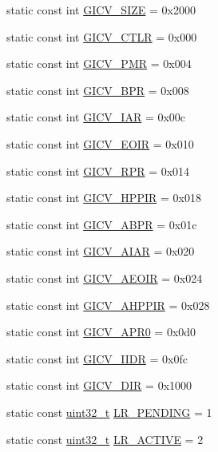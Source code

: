 \begin{DoxyCompactItemize}
\item 
static const int \hyperlink{classVGic_a327649260109afc17ff86a3a8371cb95}{GICV\_\-SIZE} = 0x2000
\item 
static const int \hyperlink{classVGic_ab4280dfa561ca960d58d341662849f7b}{GICV\_\-CTLR} = 0x000
\item 
static const int \hyperlink{classVGic_a25c57288ef4b1aad4afbc584a92b8391}{GICV\_\-PMR} = 0x004
\item 
static const int \hyperlink{classVGic_ab87c04cb10d6d7d4dc9bfdb41e67bd55}{GICV\_\-BPR} = 0x008
\item 
static const int \hyperlink{classVGic_a132fc471769307b51fb6ee13cd852835}{GICV\_\-IAR} = 0x00c
\item 
static const int \hyperlink{classVGic_ae75c9bc58bd94b6dfc83ecc0ea89e767}{GICV\_\-EOIR} = 0x010
\item 
static const int \hyperlink{classVGic_a1f4656693af03dc9ad24b55cf12eaaca}{GICV\_\-RPR} = 0x014
\item 
static const int \hyperlink{classVGic_adeb087954f3f7141cc49dd6236b4aa4c}{GICV\_\-HPPIR} = 0x018
\item 
static const int \hyperlink{classVGic_ac2262138aebc47d7e32b347f6cb580a6}{GICV\_\-ABPR} = 0x01c
\item 
static const int \hyperlink{classVGic_a471e427964bbc593aee5f4ce918b6ce2}{GICV\_\-AIAR} = 0x020
\item 
static const int \hyperlink{classVGic_a91ec09125f0759c2d32fa7bba32f3b03}{GICV\_\-AEOIR} = 0x024
\item 
static const int \hyperlink{classVGic_a95e1cf51d24aa765e82dd89f10321062}{GICV\_\-AHPPIR} = 0x028
\item 
static const int \hyperlink{classVGic_aa0efd17f14c57d720c184ee92b83ee05}{GICV\_\-APR0} = 0x0d0
\item 
static const int \hyperlink{classVGic_a40aac9b1ed27436f1ef04ff0f4b03f66}{GICV\_\-IIDR} = 0x0fc
\item 
static const int \hyperlink{classVGic_a806d487cfebc43c0536726f39a340463}{GICV\_\-DIR} = 0x1000
\item 
static const \hyperlink{Type_8hh_a435d1572bf3f880d55459d9805097f62}{uint32\_\-t} \hyperlink{classVGic_a0494deefa99c7f4fd9b8f3ee52a56cee}{LR\_\-PENDING} = 1
\item 
static const \hyperlink{Type_8hh_a435d1572bf3f880d55459d9805097f62}{uint32\_\-t} \hyperlink{classVGic_a8c71200f07eaae9cd4292f5c4438ec0b}{LR\_\-ACTIVE} = 2
\end{DoxyCompactItemize}


